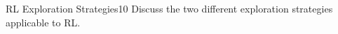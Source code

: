 
\begin{questions}
	

\begin{question}{RL Exploration Strategies}{10}
	Discuss the two different exploration strategies applicable to RL.
	
\begin{answer}\end{answer}
\end{question}




\end{questions}